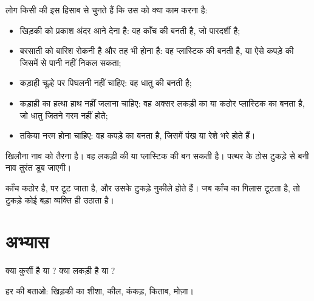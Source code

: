 \begin{proposition}[हर सामग्री अपने गुणों के कारण चुनी जाती है]\label{prop:g1:materials-around-us:choose}
लोग किसी  की  इस हिसाब से चुनते हैं कि उस  को क्या काम करना है:
\begin{itemize}
  \item खिड़की को प्रकाश अंदर आने देना है: वह काँच की बनती है, जो
        पारदर्शी है;
  \item बरसाती को बारिश रोकनी है और तह भी होना है: वह प्लास्टिक की
        बनती है, या ऐसे कपड़े की जिसमें से पानी नहीं निकल सकता;
  \item कड़ाही चूल्हे पर पिघलनी नहीं चाहिए: वह धातु की बनती है;
  \item कड़ाही का हत्था हाथ नहीं जलाना चाहिए: वह अक्सर लकड़ी का या
        कठोर प्लास्टिक का बनता है, जो धातु जितने गरम नहीं होते;
  \item तकिया नरम होना चाहिए: वह कपड़े का बनता है, जिसमें पंख
        या रेशे भरे होते हैं।
\end{itemize}
\end{proposition}

\begin{example}[नाव]\label{ex:g1:materials-around-us:boat}
खिलौना नाव को तैरना है। वह लकड़ी की या प्लास्टिक की बन सकती है।
पत्थर के ठोस टुकड़े से बनी नाव तुरंत डूब जाएगी।
\end{example}

\begin{remark}[टूटा काँच]\label{rem:g1:materials-around-us:glass}
काँच कठोर है, पर टूट जाता है, और उसके टुकड़े नुकीले होते हैं। जब
काँच का गिलास टूटता है, तो टुकड़े कोई बड़ा व्यक्ति ही उठाता है।
\end{remark}

\section{अभ्यास}

\begin{exercise}[$\star$]\label{exo:g1:materials-around-us:1}
क्या कुर्सी  है या ? क्या लकड़ी  है या ?
\end{exercise}

\begin{exercise}[$\star$]\label{exo:g1:materials-around-us:2}
हर  की  बताओ: खिड़की का शीशा, कील, कंकड़,
किताब, मोज़ा।
\end{exercise}

